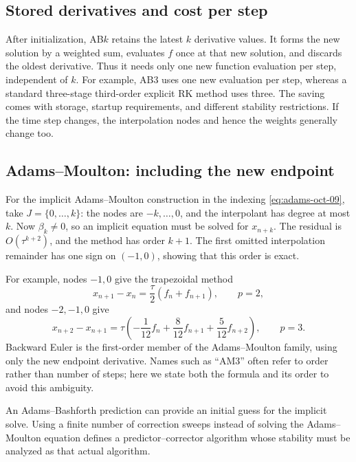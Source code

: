 \subsection{Stored derivatives and cost per step}

After initialization, AB\(k\) retains the latest \(k\) derivative
values. It forms the new solution by a weighted sum, evaluates
\(f\) once at that new solution, and discards the oldest derivative.
Thus it needs only one new function evaluation per step, independent
of \(k\). For example, AB3 uses one new evaluation per step,
whereas a standard three-stage third-order explicit RK method uses
three. The saving comes with storage, startup requirements, and
different stability restrictions. If the time step changes, the
interpolation nodes and hence the weights generally change too.

\subsection{Adams--Moulton: including the new endpoint}

For the implicit Adams--Moulton construction in the indexing
\eqref{eq:adams-oct-09}, take \(J=\{0,\ldots,k\}\): the nodes are
\(-k,\ldots,0\), and the interpolant has degree at most \(k\).
Now \(\beta_k\neq0\), so an implicit equation must be solved for
\(x_{n+k}\). The residual is \(O(\tau^{k+2})\), and the method
has order \(k+1\). The first omitted interpolation remainder has
one sign on \((-1,0)\), showing that this order is exact.

For example, nodes \(-1,0\) give the trapezoidal method
\[
 x_{n+1}-x_n=\frac\tau2(f_n+f_{n+1}),
 \qquad p=2,
\]
and nodes \(-2,-1,0\) give
\begin{equation}\label{eq:am3-oct-09}
 x_{n+2}-x_{n+1}
    =\tau\left(-\frac1{12}f_n+\frac8{12}f_{n+1}
                              +\frac5{12}f_{n+2}\right),
 \qquad p=3.
\end{equation}
Backward Euler is the first-order member of the Adams--Moulton
family, using only the new endpoint derivative. Names such as
``AM3'' often refer to order rather than number of steps; here we
state both the formula and its order to avoid this ambiguity.

An Adams--Bashforth prediction can provide an initial guess for the
implicit solve. Using a finite number of correction sweeps instead
of solving the Adams--Moulton equation defines a predictor--corrector
algorithm whose stability must be analyzed as that actual algorithm.


